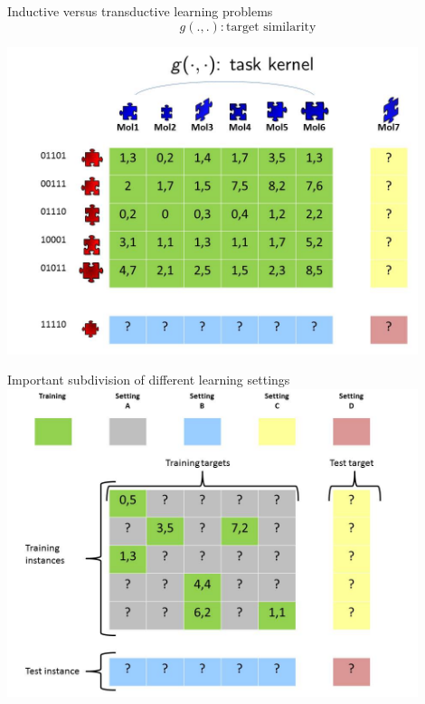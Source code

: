 \documentclass[]{beamer}
\begin{document}
\begin{frame}{Inductive versus transductive learning problems}
$$\qquad g(.,.): \mbox{target similarity}$$

\includegraphics[width=0.9\textwidth,trim = 0 0 0 60,clip]{Figures/pictures/Slide7}
\end{frame}

\begin{frame}{Important subdivision of different learning settings}
   \center
	\vspace{0.4cm}
   \includegraphics[width=0.9\textwidth]{Figures/pictures/Slide16} %
\end{frame}
\end{document}
